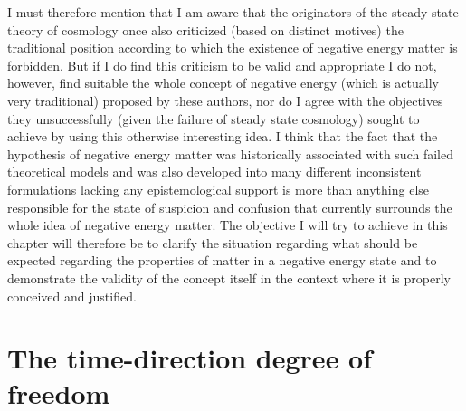 \documentclass[notitlepage,12pt]{report}
\begin{document}
I must therefore mention that I am aware that the originators of the steady state theory of cosmology once also criticized (based on distinct motives) the traditional position according to which the existence of negative energy matter is forbidden. But if I do find this criticism to be valid and appropriate I do not, however, find suitable the whole concept of negative energy (which is actually very traditional) proposed by these authors, nor do I agree with the objectives they unsuccessfully (given the failure of steady state cosmology) sought to achieve by using this otherwise interesting idea. I think that the fact that the hypothesis of negative energy matter was historically associated with such failed theoretical models and was also developed into many different inconsistent formulations lacking any epistemological support is more than anything else responsible for the state of suspicion and confusion that currently surrounds the whole idea of negative energy matter. The objective I will try to achieve in this chapter will therefore be to clarify the situation regarding what should be expected regarding the properties of matter in a negative energy state and to demonstrate the validity of the concept itself in the context where it is properly conceived and justified.

\section{The time-direction degree of freedom}
\end{document}
